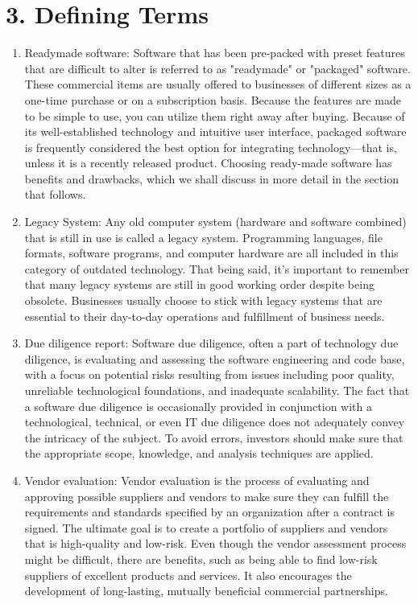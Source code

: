 \documentclass[letterpaper, 11pt]{report}
\begin{document}

\section*{3. Defining Terms}
\begin{enumerate}
    \item Readymade software: Software that has been pre-packed with preset features that are difficult to alter is referred to as "readymade" or "packaged" software. These commercial items are usually offered to businesses of different sizes as a one-time purchase or on a subscription basis. Because the features are made to be simple to use, you can utilize them right away after buying. Because of its well-established technology and intuitive user interface, packaged software is frequently considered the best option for integrating technology—that is, unless it is a recently released product. Choosing ready-made software has benefits and drawbacks, which we shall discuss in more detail in the section that follows.

    \item Legacy System: Any old computer system (hardware and software combined) that is still in use is called a legacy system. Programming languages, file formats, software programs, and computer hardware are all included in this category of outdated technology. That being said, it's important to remember that many legacy systems are still in good working order despite being obsolete. Businesses usually choose to stick with legacy systems that are essential to their day-to-day operations and fulfillment of business needs.

    \item Due diligence report: Software due diligence, often a part of technology due diligence, is evaluating and assessing the software engineering and code base, with a focus on potential risks resulting from issues including poor quality, unreliable technological foundations, and inadequate scalability. The fact that a software due diligence is occasionally provided in conjunction with a technological, technical, or even IT due diligence does not adequately convey the intricacy of the subject. To avoid errors, investors should make sure that the appropriate scope, knowledge, and analysis techniques are applied. 

    \item Vendor evaluation: Vendor evaluation is the process of evaluating and approving possible suppliers and vendors to make sure they can fulfill the requirements and standards specified by an organization after a contract is signed. The ultimate goal is to create a portfolio of suppliers and vendors that is high-quality and low-risk. Even though the vendor assessment process might be difficult, there are benefits, such as being able to find low-risk suppliers of excellent products and services. It also encourages the development of long-lasting, mutually beneficial commercial partnerships.
    
\end{enumerate}
\end{document}
